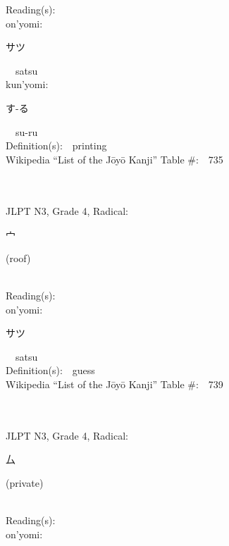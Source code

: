 \begin{multicols}{2}
Reading(s):\ \ \\
{\hspace*{1em}}on'yomi:\ \ \\
{\hspace*{2em}}{\begin{CJK}{UTF8}{min} サツ \end{CJK}}\ \ satsu\ \ \\
{\hspace*{1em}}kun'yomi:\ \ \\
{\hspace*{2em}}{\begin{CJK}{UTF8}{min} す-る \end{CJK}}\ \ su-ru\ \ \\
Definition(s):\ \ printing \\
Wikipedia ``List of the J\=oy\=o Kanji'' Table \#:\ \ 735 \\
\ \ \\
{\fontsize{34pt}{40pt}  }\ \ \\  %
{JLPT N3, Grade 4, Radical:\ \ {\begin{CJK}{UTF8}{min} 宀 \end{CJK}} (roof) } \\
Reading(s):\ \ \\
{\hspace*{1em}}on'yomi:\ \ \\
{\hspace*{2em}}{\begin{CJK}{UTF8}{min} サツ \end{CJK}}\ \ satsu\ \ \\
Definition(s):\ \ guess \\
Wikipedia ``List of the J\=oy\=o Kanji'' Table \#:\ \ 739 \\
\ \ \\
{\fontsize{34pt}{40pt}  }\ \ \\  %
{JLPT N3, Grade 4, Radical:\ \ {\begin{CJK}{UTF8}{min} 厶 \end{CJK}} (private) } \\
Reading(s):\ \ \\
{\hspace*{1em}}on'yomi:\ \ \\

\end{multicols}

